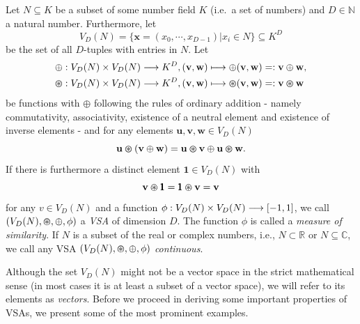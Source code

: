 \begin{defn}
	\label{def:VSA}
	Let $N \subseteq K$ be a subset of some number field $K$ (i.e.\ a set of numbers) and $D \in \mathbb{N}$ a natural number.
	Furthermore, let
	\[V_{D}(N)=\{ \mathbf{x}=\left(x_{0}, \cdots, x_{D-1}\right)  | x_{i} \in N\} \subseteq K^{D}\]
	be the set of all $D$-tuples with entries in $N$.
	Let
	\begin{align*}
		&\oplus: V_{D}(N) \times V_{D}(N) \longrightarrow K^{D}, ( \mathbf{v}, \mathbf{w}) \longmapsto \oplus( \mathbf{v}, \mathbf{w}) =: \mathbf{v}\oplus \mathbf{w}, \\
		&\varoast: V_{D}(N) \times V_{D}(N) \longrightarrow K^{D}, ( \mathbf{v}, \mathbf{w}) \longmapsto \varoast( \mathbf{v}, \mathbf{w}) =: \mathbf{v}\varoast \mathbf{w}
	\end{align*}
	be functions with $\oplus$ following the rules of ordinary addition - namely commutativity, associativity, existence of a neutral element and existence of inverse elements - and for any elements $ \mathbf{u}, \mathbf{v}, \mathbf{w} \in V_{D}(N)$
	\[ \mathbf{u} \varoast ( \mathbf{v} \oplus \mathbf{w}) = \mathbf{u} \varoast \mathbf{v} \oplus \mathbf{u} \varoast \mathbf{w}.\]
	If there is furthermore a distinct element $\pmb{1} \in V_{D}(N)$ with
	\[ \mathbf{v} \varoast \pmb{1} = \pmb{1} \varoast \mathbf{v} = \mathbf{v}\]
	for any $v \in V_{D}(N)$ and a function $\phi: V_{D}(N) \times V_{D}(N) \longrightarrow \left[-1,1\right]$, we call $(V_{D}(N), \varoast, \oplus, \phi)$ a \emph{\acrfull{VSA}} of dimension $D$.
	The function $\phi$ is called a \emph{measure of similarity}.
	If $N$ is a subset of the real or complex numbers, i.e., $N \subset \mathbb{R}$ or $N \subseteq \mathbb{C}$, we call any \ac{VSA} $\left(V_{D}(N), \varoast, \oplus, \phi\right)$ \emph{continuous}.
\end{defn}
Although the set $V_{D}(N)$ might not be a vector space in the strict mathematical sense (in most cases it is at least a subset of a vector space), we will refer to its elements as \emph{vectors}.
Before we proceed in deriving some important properties of \acp{VSA}, we present some of the most prominent examples.

